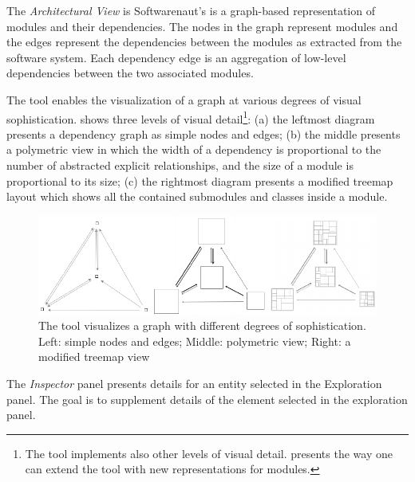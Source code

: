 \documentclass[preprint,12pt]{elsarticle}
\begin{document}
\begin{description}
\item The {\em Architectural View} is Softwarenaut's is a graph-based representation of modules and their dependencies. The nodes in the graph represent modules and the edges represent the dependencies between the modules as extracted from the software system. Each dependency edge is an aggregation of low-level dependencies between the two associated modules. 



The tool enables the visualization of a graph at various degrees of visual sophistication.  shows three levels of visual detail\footnote{The tool implements also other levels of visual detail.  presents the way one can extend the tool with new representations for modules.}: (a) the leftmost diagram presents a dependency graph as simple nodes and edges; (b) the middle presents a polymetric view \cite{lanza-pv} in which the width of a dependency is proportional to the number of abstracted explicit relationships, and the size of a module is proportional to its size; (c) the rightmost diagram presents a modified treemap layout which shows all the contained submodules and classes inside a module. 

\begin{figure}[h]
\begin{center}
\includegraphics[width=1.04\linewidth]{images/sofistication}
\caption{The tool visualizes a graph with different degrees of sophistication. Left: simple nodes and edges; Middle: polymetric view; Right: a modified treemap view}
\end{center}
\end{figure}

\item The {\em Inspector} panel presents details for an entity selected in the Exploration panel. The goal is to supplement details of the element selected in the exploration panel. %


\end{description}
\end{document}
